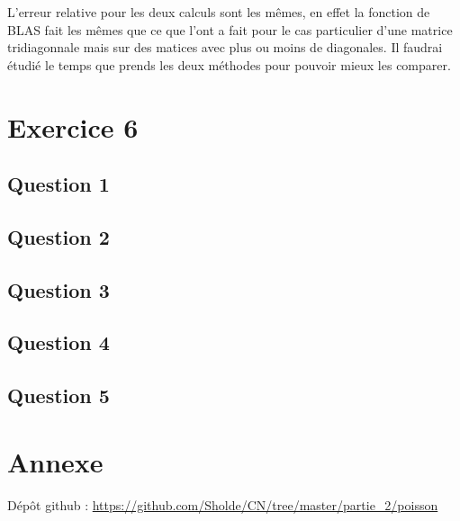 \documentclass[11pt]{article}
\begin{document}
L'erreur relative pour les deux calculs sont les mêmes, en effet la
fonction de BLAS fait les mêmes que ce que l'ont a fait pour le
cas particulier d'une matrice tridiagonnale mais sur des matices avec
plus ou moins de diagonales. Il faudrai étudié le temps que prends les
deux méthodes pour pouvoir mieux les comparer.

\section{Exercice 6}

\subsection{Question 1}

\subsection{Question 2}

\subsection{Question 3}

\subsection{Question 4}

\subsection{Question 5}

\section{Annexe}

Dépôt github : \url{https://github.com/Sholde/CN/tree/master/partie_2/poisson}
\end{document}
